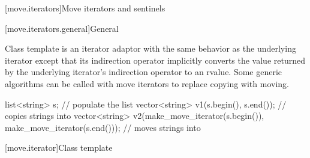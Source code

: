 [move.iterators]{Move iterators and sentinels}

[move.iterators.general]{General}

\pnum
Class template  is an iterator adaptor
with the same behavior as the underlying iterator except that its
indirection operator implicitly converts the value returned by the
underlying iterator's indirection operator to an rvalue.
Some generic algorithms can be called with move iterators to replace
copying with moving.

\pnum
\begin{example}
\begin{codeblock}
list<string> s;
// populate the list 
vector<string> v1(s.begin(), s.end());          // copies strings into 
vector<string> v2(make_move_iterator(s.begin()),
                  make_move_iterator(s.end())); // moves strings into 
\end{codeblock}

\end{example}

[move.iterator]{Class template }


